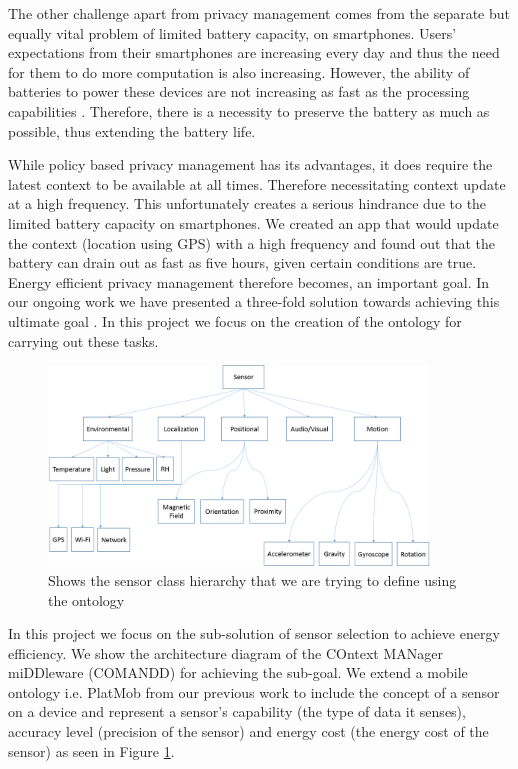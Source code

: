 \documentclass{ubicomp2013}
\begin{document}
The other challenge apart from privacy management comes from the separate but equally vital problem of limited battery capacity, on smartphones. Users' expectations from their smartphones are increasing every day and thus the need for them to do more computation is also increasing. However, the ability of batteries to power these devices are not increasing as fast as the processing capabilities \cite{boxall2012battery}. Therefore, there is a necessity to preserve the battery as much as possible, thus extending the battery life.

While policy based privacy management has its advantages, it does require the latest context to be available at all times. Therefore necessitating context update at a high frequency. This unfortunately creates a serious hindrance due to the limited battery capacity on smartphones. We created an app that would update the context (location using GPS) with a high frequency and found out that the battery can drain out as fast as five hours, given certain conditions are true. Energy efficient privacy management therefore becomes, an important goal. In our ongoing work we have presented a three-fold solution towards achieving this ultimate goal \cite{das2012energy}. In this project we focus on the creation of the ontology for carrying out these tasks.

\begin{figure}[tbh]
\centering
\includegraphics[width=0.9\textwidth]{Sensor_Class_Hierarchy.png}
\caption{Shows the sensor class hierarchy that we are trying to define using the ontology}
\label{fig:hierarchy}
\end{figure}

In this project we focus on the sub-solution of sensor selection to achieve energy efficiency. We show the architecture diagram of the COntext MANager miDDleware (COMANDD) for achieving the sub-goal. We extend a mobile ontology i.e. PlatMob \cite{ghosh2012privacy,ghosh2012ms} from our previous work to include the concept of a sensor on a device and represent a sensor's capability (the type of data it senses), accuracy level (precision of the sensor) and energy cost (the energy cost of the sensor) as seen in Figure \ref{fig:hierarchy}.
  
\end{document}
